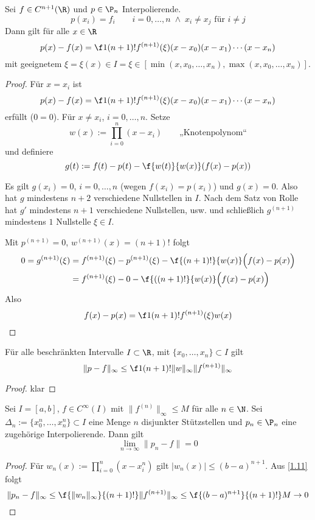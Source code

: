 \documentclass[11pt]{scrbook}
\begin{document}
\begin{st}
	\label{1.10}
	Sei $f\in C^{n+1}(\R)$ und $p\in \P_n$ Interpolierende.
	\[
		p(x_i) = f_i \qquad i=0,\dotsc,n \;\land\; x_i\neq x_j \text{ für } i\neq j
	\]
	Dann gilt für alle $x\in \R$
	\[
		p(x) - f(x) = \f 1{(n+1)!}f^{(n+1)}(\xi) (x-x_0)(x-x_1)\dotsb(x-x_n)
	\]
	mit geeignetem $\xi = \xi(x)\in I = \xi \in [\min(x,x_0,\dotsc,x_n),\max(x,x_0,\dotsc,x_n)]$.

	\begin{proof}
		Für $x=x_i$ ist 
		\[
			p(x) - f(x) = \f 1{(n+1)!}f^{(n+1)}(\xi) (x-x_0)(x-x_1)\dotsb(x-x_n)
		\]
		erfüllt ($0=0$).
		Für $x\neq x_i$, $i=0,\dotsc,n$.
		Setze
		\[
			w(x) := \prod_{i=0}^n (x-x_i) \qquad \text{„Knotenpolynom“}
		\]
		und definiere 
		\[
			g(t):= f(t)-p(t)-\f {w(t)}{w(x)}(f(x)-p(x))
		\]
		
		Es gilt $g(x_i)=0$, $i=0,\dotsc,n$ (wegen $f(x_i)=p(x_i)$) und $g(x)=0$.
		Also hat $g$ mindestens $n+2$ verschiedene Nullstellen in $I$.
		Nach dem Satz von Rolle hat $g'$ mindestens $n+1$ verschiedene Nullstellen, usw. und schließlich $g^{(n+1)}$ mindestens $1$ Nullstelle $\xi\in I$. 

		Mit $p^{(n+1)} = 0$, $w^{(n+1)}(x) = (n+1)!$ folgt
		\begin{align*}
			0 = g^{(n+1)}(\xi) &= f^{(n+1)}(\xi) - p^{(n+1)}(\xi) - \f {(n+1)!}{w(x)}\Big(f(x)-p(x)\Big)\\
			&= f^{(n+1)}(\xi) - 0 - \f {((n+1)!}{w(x)}\Big(f(x)-p(x)\Big)\\
		\end{align*}
		Also 
		\[
			f(x) -p(x) = \f 1{(n+1)!}f^{(n+1)}(\xi) w(x)
		\]
	\end{proof}
\end{st}

\begin{kor}[Fehlerschranke]
	\label{1.11}
	Für alle beschränkten Intervalle $I\subset \R$, mit $\{x_0,\dotsc,x_n\}\subset I$ gilt
	\[
		\|p-f\|_\infty \le \f 1{(n+1)!}\|w\|_\infty \|f^{(n+1)}\|_\infty
	\]
	\begin{proof}
		klar
	\end{proof}
\end{kor}

\begin{st}
	\label{1.12}
	Sei $I=[a,b]$, $f\in C^\infty(I)$ mit $\|f^{(n)}\|_\infty \le M$ für alle $n\in \N$.
	Sei $\Delta_n := \{x_0^n,\dotsc, x_n^n\}\subset I$ eine Menge $n$ disjunkter Stützstellen und $p_n\in \P_n$ eine zugehörige Interpolierende.
	Dann gilt
	\[
		\lim_{n\to \infty} \|p_n -f\| = 0
	\]
	\begin{proof}
		Für $w_n(x):=\prod_{i=0}^n(x-x_i^n)$ gilt $|w_n(x)| \le (b-a)^{n+1}$.
		Aus \ref{1.11} folgt
		\[
			\|p_n-f\|_\infty \le \f {\|w_n\|_\infty}{(n+1)!}\|f^{(n+1)}\|_\infty \le \f{(b-a)^{n+1}}{(n+1)!}M \to 0
		\]
	\end{proof}
\end{st}
\end{document}
